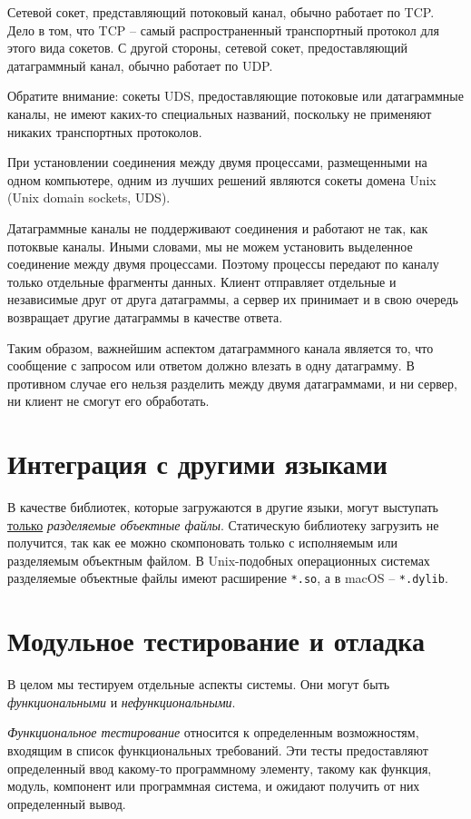 \documentclass[%
	11pt,
	a4paper,
	utf8,
		]{article}
\begin{document}
Сетевой сокет, представляющий потоковый канал, обычно работает по TCP. Дело в том, что TCP -- самый распространенный транспортный протокол для этого вида сокетов. С другой стороны, сетевой сокет, предоставляющий датаграммный канал, обычно работает по UDP. 

Обратите внимание: сокеты UDS, предоставляющие потоковые или датаграммные каналы, не имеют каких-то специальных названий, поскольку не применяют никаких транспортных протоколов.

При установлении соединения между двумя процессами, размещенными на одном компьютере, одним из лучших решений являются сокеты домена Unix (Unix domain sockets, UDS).

Датаграммные каналы не поддерживают соединения и работают не так, как потоквые каналы. Иными словами, мы не можем установить выделенное соединение между двумя процессами. Поэтому процессы передают по каналу только отдельные фрагменты данных. Клиент отправляет отдельные и независимые друг от друга датаграммы, а сервер их принимает и в свою очередь возвращает другие датаграммы в качестве ответа.

Таким образом, важнейшим аспектом датаграммного канала является то, что сообщение с запросом или ответом должно влезать в одну датаграмму. В противном случае его нельзя разделить между двумя датаграммами, и ни сервер, ни клиент не смогут его обработать.

\section{Интеграция с другими языками}

В качестве библиотек, которые загружаются в другие языки, могут выступать \underline{только} \emph{разделяемые объектные файлы}. Статическую библиотеку загрузить не получится, так как ее можно скомпоновать только с исполняемым или разделяемым объектным файлом. В Unix-подобных операционных системах разделяемые объектные файлы имеют расширение \verb|*.so|, а в macOS -- \verb|*.dylib|.

\section{Модульное тестирование и отладка}

В целом мы тестируем отдельные аспекты системы. Они могут быть \emph{функциональными} и \emph{нефункциональными}.

\emph{Функциональное тестирование} относится к определенным возможностям, входящим в список функциональных требований. Эти тесты предоставляют определенный ввод какому-то программному элементу, такому как функция, модуль, компонент или программная система, и ожидают получить от них определенный вывод.
\end{document}
